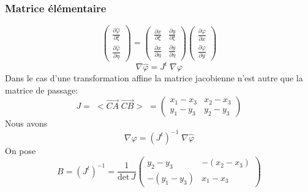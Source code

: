 \documentclass{beamer}
\begin{document}
\begin{frame}
\frametitle{Matrice élémentaire}


\[\left(\begin{array}{l}
\displaystyle \frac{\partial \widehat{\varphi}}{\partial \xi}\\
\displaystyle \frac{\partial \widehat{\varphi}}{\partial \eta}
\end{array}\right)
=\left(\begin{array}{cc}
\displaystyle \frac{\partial x}{\partial \xi}&\displaystyle \frac{\partial y}{\partial \xi}\\
\displaystyle \frac{\partial x}{\partial \eta}&\displaystyle \frac{\partial y}{\partial \eta}
\end{array}\right)
\left(\begin{array}{l}
\displaystyle \frac{\partial \varphi}{\partial x}\\
\displaystyle \frac{\partial \varphi}{\partial y}
\end{array}\right)
\]
\[\nabla\widehat{\varphi} = J^t\; \nabla\varphi\]
Dans le cas d'une transformation affine la matrice jacobienne n'est autre que la matrice de passage:
\[J=\;<\overrightarrow{CA} \; \overrightarrow{CB}>\;=\left(\begin{array}{cc}
x_1-x_3 & x_2-x_3 \\
y_1-y_3 & y_2-y_3 
\end{array}\right)\]
Nous avons \[\nabla \varphi=( J^t)^{-1}\; \nabla\widehat{\varphi} \]
On pose \[B= ( J^t)^{-1}=\frac{1}{\mbox{det}\,  J}\left(\begin{array}{cc}
y_2-y_3   & -(x_2-x_3) \\
-(y_1-y_3) & x_1-x_3
\end{array}\right)\]
\end{frame}
\end{document}
